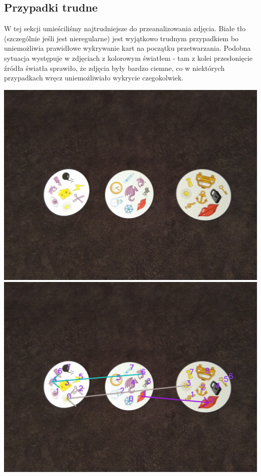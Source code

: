 \documentclass[10pt,a4paper]{article}
\begin{document}
\subsection{Przypadki trudne}
W tej sekcji umieściliśmy najtrudniejsze do przeanalizowania zdjęcia. Białe tło (szczególnie jeśli jest nieregularne) jest wyjątkowo trudnym przypadkiem bo uniemożliwia prawidłowe wykrywanie kart na początku przetwarzania. Podobna sytuacja występuje w zdjęciach z kolorowym światłem - tam z kolei przesłonięcie źródła światła sprawiło, że zdjęcia były bardzo ciemne, co w niektórych przypadkach wręcz uniemożliwiało wykrycie czegokolwiek.
\newpage
\begin{center}
\includegraphics[scale=0.28]{hard/dobble11.jpg}
\includegraphics[scale=0.28]{hard/img_arrows1.jpg}\\

\end{center}
\end{document}
